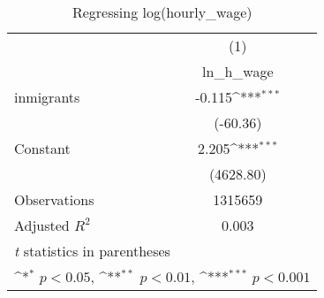 \begin{table}[htbp]\centering
\def\sym#1{\ifmmode^{#1}\else\(^{#1}\)\fi}
\caption{Regressing log(hourly\_wage)}
\begin{tabular}{l*{1}{c}}
\hline\hline
                    &\multicolumn{1}{c}{(1)}\\
                    &\multicolumn{1}{c}{ln\_h\_wage}\\
\hline
inmigrants          &      -0.115\sym{***}\\
                    &    (-60.36)         \\
[1em]
Constant            &       2.205\sym{***}\\
                    &   (4628.80)         \\
\hline
Observations        &     1315659         \\
Adjusted \(R^{2}\)  &       0.003         \\
\hline\hline
\multicolumn{2}{l}{\footnotesize \textit{t} statistics in parentheses}\\
\multicolumn{2}{l}{\footnotesize \sym{*} \(p<0.05\), \sym{**} \(p<0.01\), \sym{***} \(p<0.001\)}\\
\end{tabular}
\end{table}
